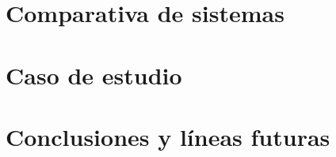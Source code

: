 \documentclass[a4paper, 12pt]{memoir} %
\begin{document}
\chapter{Comparativa de sistemas} \label{chapter:comparativa}

\clearpage

\chapter{Caso de estudio} \label{chapter:estudio}

\clearpage

\chapter{Conclusiones y líneas futuras} \label{chapter:conclusiones}


\glsaddall %

\end{document}
